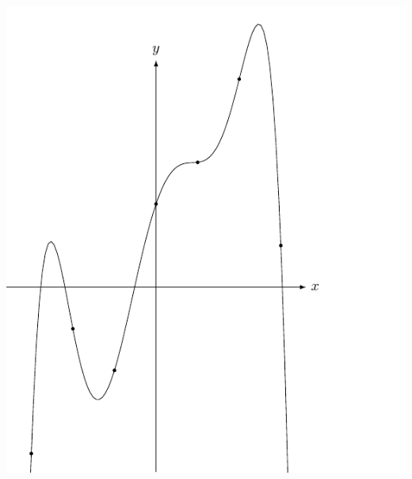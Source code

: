 \documentclass{report}[10pts]
\begin{document}
\begin{center}
\includegraphics{Lagrange_Fig.pdf}
\end{center}
\end{document}
